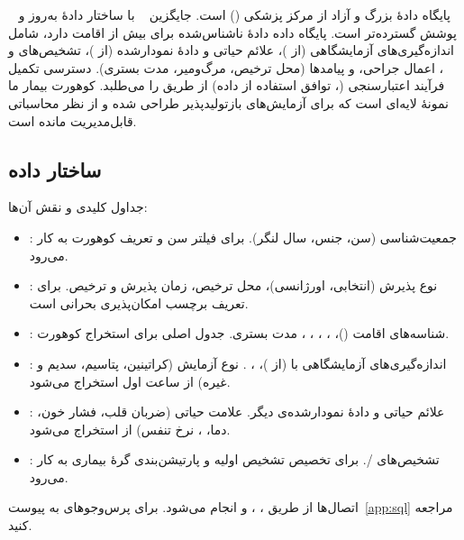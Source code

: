 ~\cite{johnson2023mimic} پایگاه دادۀ بزرگ و آزاد  از مرکز پزشکی  () است. جایگزین ~\cite{johnson2016mimic} با ساختار دادۀ به‌روز و پوشش گسترده‌تر است. پایگاه داده دادۀ ناشناس‌شده برای بیش از  اقامت  دارد، شامل اندازه‌گیری‌های آزمایشگاهی (از \texttt{})، علائم حیاتی و دادۀ نمودارشده (از \texttt{})، تشخیص‌های  و ، اعمال جراحی، و پیامدها (محل ترخیص، مرگ‌ومیر، مدت بستری). دسترسی تکمیل فرآیند اعتبارسنجی (، توافق استفاده از داده) از طریق  را می‌طلبد. کوهورت  بیمار ما نمونۀ لایه‌ای است که برای آزمایش‌های بازتولیدپذیر طراحی شده و از نظر محاسباتی قابل‌مدیریت مانده است.

\subsection{ساختار داده}

جداول کلیدی و نقش آن‌ها:
\begin{itemize}
\item \texttt{}: جمعیت‌شناسی (سن، جنس، سال لنگر). برای فیلتر سن و تعریف کوهورت به کار می‌رود.
\item \texttt{}: نوع پذیرش (انتخابی، اورژانسی)، محل ترخیص، زمان پذیرش و ترخیص. برای تعریف برچسب امکان‌پذیری بحرانی است.
\item \texttt{}: شناسه‌های اقامت  (\texttt{})، \texttt{}، \texttt{}، \texttt{}، \texttt{}، مدت بستری. جدول اصلی برای استخراج کوهورت.
\item \texttt{}: اندازه‌گیری‌های آزمایشگاهی با \texttt{} (از \texttt{})، \texttt{}، \texttt{}.  نوع آزمایش (کراتینین، پتاسیم، سدیم و غیره) از  ساعت اول استخراج می‌شود.
\item \texttt{}: علائم حیاتی و دادۀ نمودارشده‌ی دیگر.  علامت حیاتی (ضربان قلب، فشار خون، دما، ، نرخ تنفس) از \texttt{} استخراج می‌شود.
\item \texttt{}: تشخیص‌های /. برای تخصیص تشخیص اولیه و پارتیشن‌بندی گرۀ بیماری به کار می‌رود.
\end{itemize}
اتصال‌ها از طریق \texttt{}، \texttt{}، و \texttt{} انجام می‌شود. برای پرس‌وجوهای  به پیوست~\ref{app:sql} مراجعه کنید.

